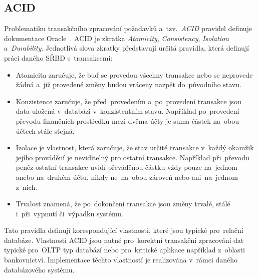 \subsection{ACID}
\label{subsection:acid}
Problematiku transakčního zpracování požadavků a~tzv.~\textit{ACID} pravidel definuje dokumentace
Oracle~\cite{OracleTransactions}. ACID je zkratka \textit{Atomicity}, \textit{Consistency}, \textit{Isolation} a~\textit{Durability}. Jednotlivá slova zkratky představují určitá pravidla, která definují práci daného SŘBD s~transakcemi:
\begin{itemize}
    \item Atomicita zaručuje, že buď se provedou všechny transakce nebo se neprovede žádná a~již provedené změny
    budou vráceny nazpět do~původního stavu.
    \item Konzistence zaručuje, že před~provedením a~po~provedení transakce jsou data uložená v~databázi
    v~konzistentním stavu. Například po~provedení převodu finančních prostředků mezi dvěma účty je suma částek
    na~obou účtech stále stejná.
    \item Izolace je vlastnost, která zaručuje, že stav určité transakce v~každý okamžik jejího provádění je
    neviditelný pro ostatní transakce. Například při~převodu peněz ostatní transakce uvidí převáděnou částku vždy
    pouze na~jednom anebo na~druhém účtu, nikdy ne~na~obou zároveň nebo ani~na~jednom z~nich.
    \item Trvalost znamená, že po~dokončení transakce jsou změny trvalé, stálé i~při~vypnutí či~výpadku systému.
\end{itemize}
Tato pravidla definují korespondující vlastnosti, které jsou typické pro~relační databáze. Vlastnosti ACID jsou
nutné pro~korektní transakční zpracování dat typické pro~OLTP typ databází nebo pro~kritické aplikace například z~oblasti bankovnictví. Implementace těchto vlastností je realizována v~rámci daného databázového systému.

